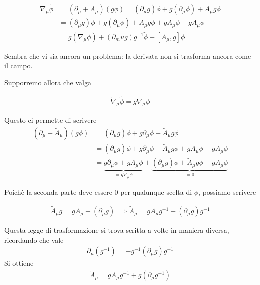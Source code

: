 \documentclass{report}
\begin{document}
\begin{align}
    \nabla_\mu \tilde{\phi} &= (\partial_\mu + A_{\mu})(g\phi) = (\partial_\mu g)\phi + g(\partial_\mu \phi) + A_\mu g\phi \\
    &= (\partial_\mu g)\phi + g(\partial_\mu \phi) + A_\mu g\phi + g A_\mu \phi - g A_\mu \phi \\
    &= g(\nabla_\mu \phi) + (\partial_mu g)g^{-1}\tilde{\phi} + [A_\mu, g]\phi
\end{align}

Sembra che vi sia ancora un problema: la derivata non si trasforma ancora come il campo. 


Supporremo allora che valga 

\begin{align}
    \tilde{\nabla}_\mu \tilde{\phi} = g \nabla_\mu \phi
\end{align}

Questo ci permette di scrivere 
\begin{align}
    (\partial_\mu + \tilde{A}_\mu)(g\phi) &= (\partial_\mu g)\phi + g\partial_\mu \phi + \tilde{A}_\mu g \phi \\
    &= (\partial_\mu g)\phi + g\partial_\mu \phi + \tilde{A}_\mu g \phi + gA_\mu \phi -gA_\mu \phi \\
    &= \underbrace{g \partial_\mu \phi + gA_\mu \phi}_{= g\nabla_\mu\phi} + \underbrace{(\partial_\mu g)\phi + \tilde{A}_\mu g\phi -gA_\mu \phi}_{=0}
\end{align}

Poichè la seconda parte deve essere 0 per qualunque scelta di \(\phi\), possiamo scrivere 

\begin{align}
    \tilde{A}_\mu g = gA_\mu - (\partial_\mu g) \implies \tilde{A}_\mu = gA_\mu g^{-1} - (\partial_\mu g)g^{-1}
\end{align}

Questa legge di trasformazione si trova scritta a volte in maniera diversa, ricordando che vale 
\begin{align}
    \partial_\mu(g^{-1}) = -g^{-1}(\partial_\mu g)g^{-1}
\end{align}
Si ottiene 
\begin{align}
    \tilde{A}_\mu = gA_\mu g^{-1} + g(\partial_\mu g^{-1})
\end{align}
\end{document}
